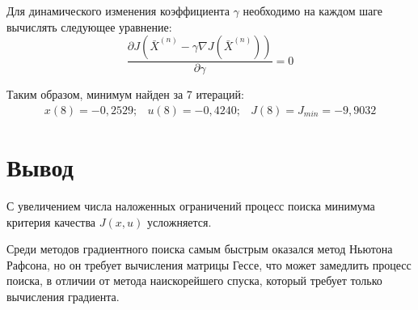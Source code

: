 \documentclass[14pt, a4paper]{extarticle}
\begin{document}
	Для динамического изменения коэффициента $\gamma$ необходимо на каждом шаге вычислять следующее уравнение:
	$$\frac{\partial J(\bar{X}^{(n)}-\gamma\nabla J(\bar{X}^{(n)}))}{\partial \gamma}=0$$
	
	Таким образом, минимум найден за 7 итераций:
	$$\begin{matrix}
		x(8)=-0,2529; & u(8)=-0,4240; & J(8)=J_{min}=-9,9032
	\end{matrix}$$

	\newpage
	
	\section*{Вывод}
	
	С увеличением числа наложенных ограничений процесс поиска минимума критерия качества $J(x,u)$ усложняется.
	
	Среди методов градиентного поиска самым быстрым оказался метод Ньютона Рафсона, но он требует вычисления матрицы Гессе, что может замедлить процесс поиска, в отличии от метода наискорейшего спуска, который требует только вычисления градиента.
	
\end{document}
